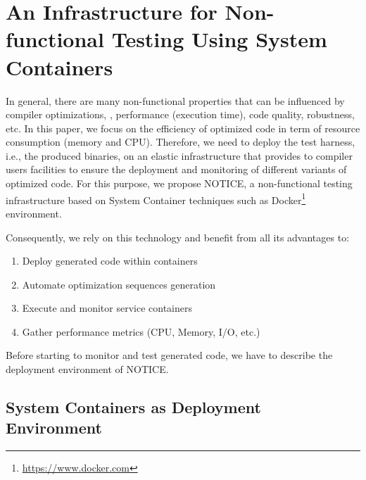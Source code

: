 \section{An Infrastructure for Non-functional Testing Using System Containers}
In general, there are many non-functional properties that can be influenced by compiler optimizations, \eg, performance (execution time), code quality, robustness, etc. In this paper, we focus on the efficiency of optimized code in term of resource consumption (memory and CPU).
Therefore, we need to deploy the test harness, i.e., the produced binaries, on an elastic infrastructure that provides to compiler users facilities to ensure the deployment and monitoring of different variants of optimized code. 
For this purpose, we propose NOTICE, a non-functional testing infrastructure based on System Container techniques such as Docker\footnote{\url{https://www.docker.com}} environment. 

Consequently, we rely on this technology and benefit from all its advantages to:
\begin{enumerate}
	\item Deploy generated code within containers
	\item Automate optimization sequences generation
	\item Execute and monitor service containers
	\item Gather performance metrics (CPU, Memory, I/O, etc.)
\end{enumerate}


Before starting to monitor and test generated code, we have to describe the deployment environment of NOTICE.
\subsection{System Containers as Deployment Environment}

